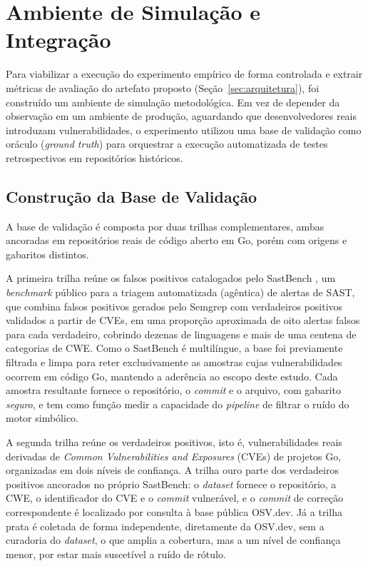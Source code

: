 \section{Ambiente de Simulação e Integração}
\label{sec:simulacao}

Para viabilizar a execução do experimento empírico de forma controlada e extrair métricas de avaliação do artefato proposto (Seção~\ref{sec:arquitetura}), foi construído um ambiente de simulação metodológica. Em vez de depender da observação em um ambiente de produção, aguardando que desenvolvedores reais introduzam vulnerabilidades, o experimento utilizou uma base de validação como oráculo (\textit{ground truth}) para orquestrar a execução automatizada de testes retrospectivos em repositórios históricos.

\subsection{Construção da Base de Validação}
\label{subsec:base}

A base de validação é composta por duas trilhas complementares, ambas ancoradas em repositórios reais de código aberto em Go, porém com origens e gabaritos distintos.

A primeira trilha reúne os falsos positivos catalogados pelo SastBench \cite{feiglin2026sastbench}, um \textit{benchmark} público para a triagem automatizada (agêntica) de alertas de SAST, que combina falsos positivos gerados pelo Semgrep com verdadeiros positivos validados a partir de CVEs, em uma proporção aproximada de oito alertas falsos para cada verdadeiro, cobrindo dezenas de linguagens e mais de uma centena de categorias de CWE. Como o SastBench é multilíngue, a base foi previamente filtrada e limpa para reter exclusivamente as amostras cujas vulnerabilidades ocorrem em código Go, mantendo a aderência ao escopo deste estudo. Cada amostra resultante fornece o repositório, o \textit{commit} e o arquivo, com gabarito \textit{seguro}, e tem como função medir a capacidade do \textit{pipeline} de filtrar o ruído do motor simbólico.

A segunda trilha reúne os verdadeiros positivos, isto é, vulnerabilidades reais derivadas de \textit{Common Vulnerabilities and Exposures} (CVEs) de projetos Go, organizadas em dois níveis de confiança. A trilha ouro parte dos verdadeiros positivos ancorados no próprio SastBench: o \textit{dataset} fornece o repositório, a CWE, o identificador do CVE e o \textit{commit} vulnerável, e o \textit{commit} de correção correspondente é localizado por consulta à base pública OSV.dev. Já a trilha prata é coletada de forma independente, diretamente da OSV.dev, sem a curadoria do \textit{dataset}, o que amplia a cobertura, mas a um nível de confiança menor, por estar mais suscetível a ruído de rótulo.

